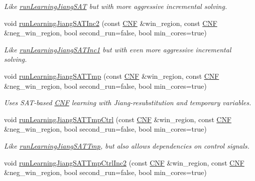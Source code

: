 \begin{DoxyCompactItemize}
\begin{DoxyCompactList}\small\item\em Like \hyperlink{classLearningImplExtractor_a39668b94568dde5459d979684d99253f}{run\-Learning\-Jiang\-S\-A\-T} but with more aggressive incremental solving. \end{DoxyCompactList}\item 
void \hyperlink{classLearningImplExtractor_a2ee6e07a5c9907195c1af8cba613dbd1}{run\-Learning\-Jiang\-S\-A\-T\-Inc2} (const \hyperlink{classCNF}{C\-N\-F} \&win\-\_\-region, const \hyperlink{classCNF}{C\-N\-F} \&neg\-\_\-win\-\_\-region, bool second\-\_\-run=false, bool min\-\_\-cores=true)
\begin{DoxyCompactList}\small\item\em Like \hyperlink{classLearningImplExtractor_a036ab2a3921696d31fb55139427d2114}{run\-Learning\-Jiang\-S\-A\-T\-Inc1} but with even more aggressive incremental solving. \end{DoxyCompactList}\item 
void \hyperlink{classLearningImplExtractor_ad214c79ae2c0e56a47ad97ad2e5c3765}{run\-Learning\-Jiang\-S\-A\-T\-Tmp} (const \hyperlink{classCNF}{C\-N\-F} \&win\-\_\-region, const \hyperlink{classCNF}{C\-N\-F} \&neg\-\_\-win\-\_\-region, bool second\-\_\-run=false, bool min\-\_\-cores=true)
\begin{DoxyCompactList}\small\item\em Uses S\-A\-T-\/based \hyperlink{classCNF}{C\-N\-F} learning with Jiang-\/resubstitution and temporary variables. \end{DoxyCompactList}\item 
void \hyperlink{classLearningImplExtractor_ad41484b6bb6da18e50d31830a18e63e9}{run\-Learning\-Jiang\-S\-A\-T\-Tmp\-Ctrl} (const \hyperlink{classCNF}{C\-N\-F} \&win\-\_\-region, const \hyperlink{classCNF}{C\-N\-F} \&neg\-\_\-win\-\_\-region, bool second\-\_\-run=false, bool min\-\_\-cores=true)
\begin{DoxyCompactList}\small\item\em Like \hyperlink{classLearningImplExtractor_ad214c79ae2c0e56a47ad97ad2e5c3765}{run\-Learning\-Jiang\-S\-A\-T\-Tmp}, but also allows dependencies on control signals. \end{DoxyCompactList}\item 
void \hyperlink{classLearningImplExtractor_a5ce27f574afbb4504b7acd82196314d7}{run\-Learning\-Jiang\-S\-A\-T\-Tmp\-Ctrl\-Inc2} (const \hyperlink{classCNF}{C\-N\-F} \&win\-\_\-region, const \hyperlink{classCNF}{C\-N\-F} \&neg\-\_\-win\-\_\-region, bool second\-\_\-run=false, bool min\-\_\-cores=true)

\end{DoxyCompactItemize}
